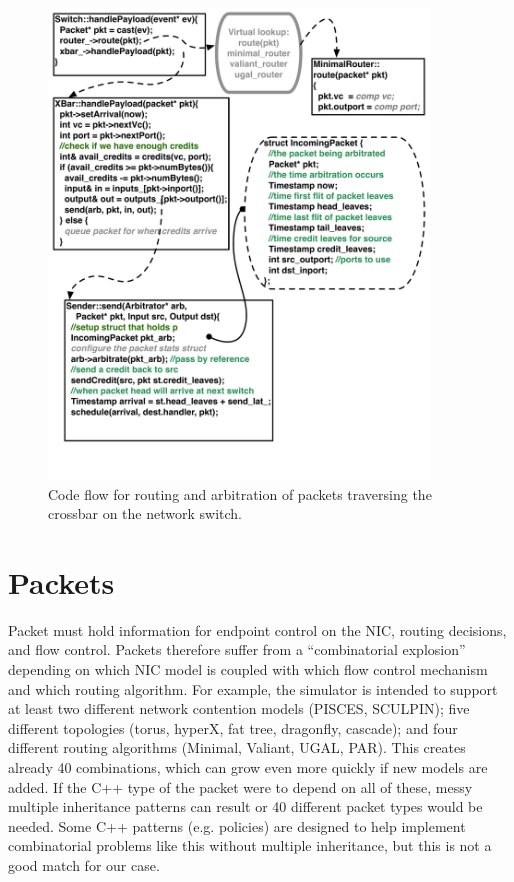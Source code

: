 \begin{figure}
\includegraphics[width=0.9\textwidth]{figures/RoutingFlow}
\caption{Code flow for routing and arbitration of packets traversing the crossbar on the network switch.}
\label{fig:xbarFlow}
\end{figure}

\section{Packets}
Packet must hold information for endpoint control on the NIC, routing decisions, and flow control. 
Packets therefore suffer from a ``combinatorial explosion'' depending on which NIC model is coupled with which flow control mechanism and which routing algorithm.
For example, the simulator is intended to support at least two different network contention models (PISCES, SCULPIN);
five different topologies (torus, hyperX, fat tree, dragonfly, cascade); and four different routing algorithms (Minimal, Valiant, UGAL, PAR).
This creates already 40 combinations, which can grow even more quickly if new models are added.
If the C++ type of the packet were to depend on all of these, messy multiple inheritance patterns can result or 40 different packet types would be needed.
Some C++ patterns (e.g. policies) are designed to help implement combinatorial problems like this without multiple inheritance,
but this is not a good match for our case.

